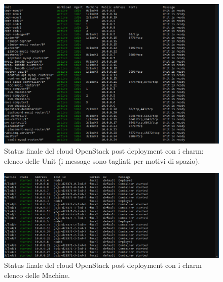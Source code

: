 \begin{figure}%
    \centering
    \includegraphics[width=1\linewidth]{tesi/files/immagini/openstack/finish(unit).png}
    \caption{Status finale del cloud OpenStack post deployment con i charm: elenco delle Unit (i message sono tagliati per motivi di spazio).}
    \label{fig:juju_status_finish_unit}
\end{figure}

\begin{figure}%
    \centering
    \includegraphics[width=1\linewidth]{tesi/files/immagini/openstack/finish(machine).png}
    \caption{Status finale del cloud OpenStack post deployment con i charm elenco delle Machine.}
    \label{fig:juju_status_finish_machine}
\end{figure}



